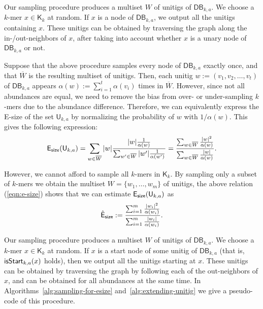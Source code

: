 \documentclass[a4paper,11pt]{article}
\newcommand{\kristoffer}[1]{{\color{red}{#1}}}
\newcommand{\alex}[1]{{\color{blue}{#1}}}
\newcommand{\DB}{\mathsf{DB}_{k,a}}
\newcommand{\U}{\mathsf{U}_{k,a}}
\newcommand{\K}{\mathsf{K}}
\newcommand{\abu}{\alpha}
\newcommand{\esize}{{\sf E_{size}}}
\newcommand{\isstart}{{\sf isStart}_{k,a}}
\begin{document}

\alex{OLD:} Our sampling procedure produces a multiset $W$ of unitigs of $\DB$. We choose a $k$-mer $x \in \K_k$ at random. If $x$ is a node of $\DB$, we output all the unitigs containing $x$. These unitigs can be obtained by traversing the graph along the in-/out-neighbors of $x$, after taking into account whether $x$ is a unary node of $\DB$ or not. 

Suppose that the above procedure samples every node of $\DB$ exactly once, and that $\overline{W}$ is the resulting multiset of unitigs. Then, each unitig $w := (v_1,v_2,\dots,v_t)$ of $\DB$ appears $\alpha(w) := \sum_{i = 1}^{t}\alpha(v_i)$ times in $\overline{W}$. However, since not all abundances are equal, we need to remove the bias from over- or under-sampling $k$-mers due to the abundance difference. Therefore, we can equivalently express the E-size of the set $\U$ by normalizing the probability of $w$ with $1/\abu(w)$. This gives the following expression:
\begin{equation}
\esize(\U) = \sum_{w \in \overline{W}} |w| \frac{|w|\frac{1}{\alpha(w)}}{\sum_{w' \in \overline{W}}|w'|\frac{1}{\alpha(w')}} = \frac{\sum_{w \in \overline{W}}\frac{|w|^2}{\alpha(w)}}{\sum_{w \in \overline{W}}\frac{|w|}{\alpha(w)}}.
\label{eqn:e-size}
\end{equation}

However, we cannot afford to sample all $k$-mers in $\K_k$. By sampling only a subset of $k$-mers we obtain the multiset $W = \{w_1,\dots,w_m\}$ of unitigs, the above relation (\ref{eqn:e-size}) shows that we can estimate $\esize(\U)$ as 
\[\hat{{\sf E}}_{\sf size} := \frac{\sum_{i = 1}^{m}\frac{|w_i|^2}{\alpha(w_i)}}{\sum_{i=1}^{m}\frac{|w_i|}{\alpha(w_i)}}.\]

\alex{NEW:} Our sampling procedure produces a multiset $W$ of unitigs of $\DB$. We choose a $k$-mer $x \in \K_k$ at random. If $x$ is a start node of some unitig of $\DB$ (that is, $\isstart(x)$ holds), then we output all the unitigs starting at $x$. These unitigs can be obtained by traversing the graph by following each of the out-neighbors of $x$, and can be obtained for all abundances at the same time. In Algorithms~\ref{alg:sampling-for-esize} and~\ref{alg:extending-unitig} we give a pseudo-code of this procedure. 
\end{document}
